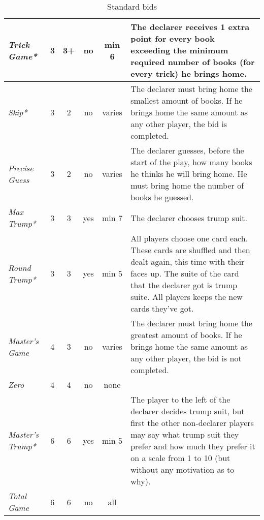 \begin{table}
\begin{center}
{\begin{tabular*}{\textwidth}{ lcccc | p{5cm} }
					\textit{Trick Game*} &
					3 & 3+ & no & min 6 &
					The declarer receives 1 extra point for every book exceeding the minimum required number of books (for every trick) he brings home.
					\\ \hline
					
					\textit{Skip*} &
					3 & 2 & no & varies &
					The declarer must bring home the smallest amount of books. If he brings home the same amount as any other player, the bid is completed.
					\\ \hline
					
					\textit{Precise Guess} &
					3 & 2 & no & varies &
					The declarer guesses, before the start of the play, how many books he thinks he will bring home. He must bring home the number of books he guessed.
					\\ \hline
					
					\textit{Max Trump*} &
					3 & 3 & yes & min 7 &
					The declarer chooses trump suit.
					\\ \hline
					
					\textit{Round Trump*} &
					3 & 3 & yes & min 5 &
					All players choose one card each. These cards are shuffled and then dealt again, this time with their faces up. The suite of the card that the declarer got is trump suite. All players keeps the new cards they've got.
					\\ \hline
					
					\textit{Master's Game} &
					4 & 3 & no & varies &
					The declarer must bring home the greatest amount of books. If he brings home the same amount as any other player, the bid is not completed. 
					\\ \hline
					
					\textit{Zero} &
					4 & 4 & no & none &
					\\ \hline
					
					\textit{Master's Trump*} &
					6 & 6 & yes & min 5 &
					The player to the left of the declarer decides trump suit, but first the other non-declarer players may say what trump suit they prefer and how much they prefer it on a scale from 1 to 10 (but without any motivation as to why).
					\\ \hline
					
					\textit{Total Game} &
					6 & 6 & no & all &
			\end{tabular*}
		}
	\end{center}
	\caption{Standard bids}
	\label{tab:standardBids}
\end{table}
